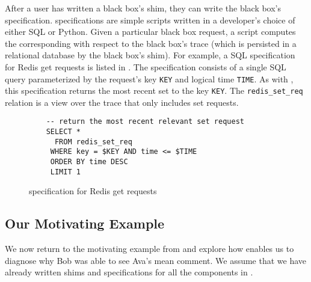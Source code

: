 After a user has written a black box's shim, they can write the black box's
\watprovenance{} specification. \fluent{} \watprovenance{} specifications are
simple scripts written in a developer's choice of either SQL or Python. Given a particular black box
request, a \watprovenance{}  script computes the corresponding \watprovenance{}
with respect to the black box's trace (which is persisted in a relational
database by the black box's shim). For example, a SQL \watprovenance{}
specification for Redis get requests is listed in
. The \watprovenance{} specification consists of
a single SQL query parameterized by the request's key \texttt{KEY} and logical
time \texttt{TIME}. As with , this \watprovenance{}
specification returns the most recent set to the key \texttt{KEY}. The
\texttt{redis\_set\_req} relation is a view over the trace that only includes
set requests.

\begin{figure}[ht]
  \begin{Verbatim}
    -- return the most recent relevant set request
    SELECT *
      FROM redis_set_req
     WHERE key = $KEY AND time <= $TIME
     ORDER BY time DESC
     LIMIT 1
  \end{Verbatim}
  \caption{\Watprovenance{} specification for Redis get requests}
\end{figure}

\subsection{Our Motivating Example}
\newcommand{\systemname}{ZardozBook}
We now return to the motivating example from  and
explore how \fluent{} enables us to diagnose why Bob was able to see Ava's mean
comment. We assume that we have already written \fluent{} shims and
\watprovenance{} specifications for all the components in . 

